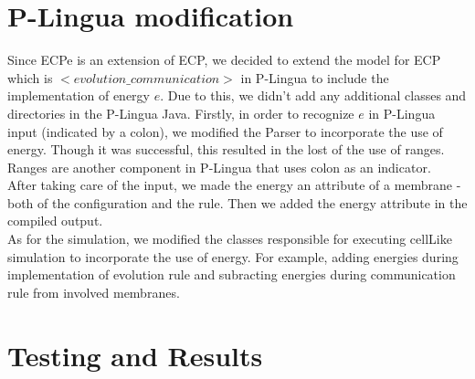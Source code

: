 \documentclass{acm_proc_article-sp}
\begin{document}
\section{P-Lingua modification}
	Since ECPe is an extension of ECP, we decided to extend the model for ECP which is $<evolution\_communication>$ in P-Lingua to include the implementation of energy $e$. Due to this, we didn't add any additional classes and directories in the P-Lingua Java. Firstly, in order to recognize $e$ in P-Lingua input (indicated by a colon), we modified the Parser to incorporate the use of energy. Though it was successful, this resulted in the lost of the use of ranges. Ranges are another component in P-Lingua that uses colon as an indicator.\\
    After taking care of the input, we made the energy an attribute of a membrane - both of the configuration and the rule. Then we added the energy attribute in the compiled output.\\
    As for the simulation, we modified the classes responsible for executing cellLike simulation to incorporate the use of energy. For example, adding energies during implementation of evolution rule and subracting energies during communication rule from involved membranes.
    

\section{Testing and Results}
\end{document}
